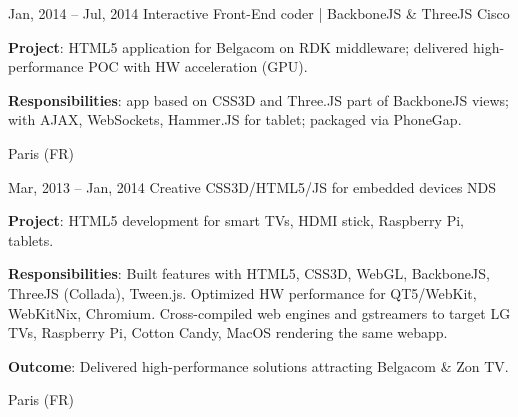 \documentclass[
  a4paper,
   maincolor=cvblue,
   sectioncolor=cvblue,
   sidebarwidth=0.323\paperwidth,
]{fortysecondscv}
\begin{document}
\newpage
\makethirdsidebar

\vspace*{-1em} %
\begin{cvtableNew}
  \cvitemRightNew
    {Jan, 2014 – Jul, 2014} %
    {Interactive Front-End coder | BackboneJS \& ThreeJS} %
    {Cisco} %
    {
      \vspace{1pt}
      \fontsize{10.8pt}{12pt}\selectfont %
      \textbf{Project}: HTML5 application for Belgacom on RDK middleware; delivered high-performance POC with HW acceleration (GPU).\par
      \vspace{4pt}
      \textbf{Responsibilities}: app based on CSS3D and Three.JS part of BackboneJS views; with AJAX, WebSockets, Hammer.JS for tablet; packaged via PhoneGap.\par
    }
    {Paris (FR)} %

    \vspace{1.57mm} %

  \cvitemRightNew
    {Mar, 2013 – Jan, 2014} %
    {Creative CSS3D/HTML5/JS for embedded devices } %
    {NDS} %
    {
      \vspace{1pt}
      \fontsize{10.8pt}{12pt}\selectfont %
      \textbf{Project}: HTML5 development for smart TVs, HDMI stick, Raspberry Pi, tablets.\par
      \vspace{4pt}
      \textbf{Responsibilities}: Built features with HTML5, CSS3D, WebGL, BackboneJS, ThreeJS (Collada), Tween.js.
      Optimized HW performance for QT5/WebKit, WebKitNix, Chromium. Cross-compiled web engines and gstreamers to target LG TVs,
      Raspberry Pi, Cotton Candy, MacOS rendering the same webapp.\par
      \vspace{4pt}
      \textbf{Outcome}: Delivered high-performance solutions attracting Belgacom \& Zon TV.\par
    }
    {Paris (FR)} %

    \vspace{1.57mm} %


\end{cvtableNew}
\end{document}
